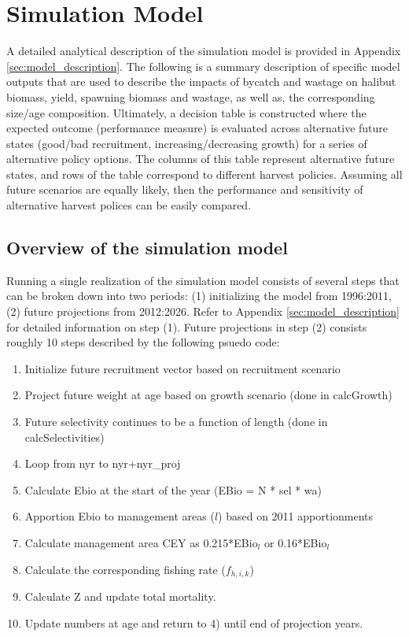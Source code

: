 
\section{Simulation Model} %
\label{sec:simulation_model}
A detailed analytical description of the simulation model is provided in Appendix \ref{sec:model_description}.  The following is a summary description of specific model outputs that are used to describe the impacts of bycatch and wastage on halibut biomass, yield, spawning biomass and wastage, as well as, the corresponding size/age composition.  Ultimately, a decision table is constructed where the expected outcome (performance measure) is evaluated across alternative future states (good/bad recruitment, increasing/decreasing growth) for a series of alternative policy options.  The columns of this table represent alternative future states, and rows of the table correspond to different harvest policies. Assuming all future scenarios are equally likely, then the performance and sensitivity of alternative harvest polices can be easily compared.

\subsection{Overview of the simulation model} %
\label{sub:overview_of_the_simulation_model}
 Running a single realization of the simulation model consists of several steps that can be broken down into two periods: (1) initializing the model from 1996:2011, (2) future projections from 2012:2026.  Refer to Appendix \ref{sec:model_description} for detailed information on step (1).  Future projections in step (2) consists roughly 10 steps described by the following psuedo code:
\begin{enumerate}
	\item	Initialize future recruitment vector based on recruitment scenario
	\item	Project future weight at age based on growth scenario  (done in calcGrowth)
	\item	Future selectivity continues to be a function of length (done in calcSelectivities)
	\item	Loop from nyr to nyr+nyr\_proj
	\item	Calculate Ebio at the start of the year (EBio = N * sel * wa)
	\item	Apportion Ebio to management areas ($l$) based on 2011 apportionments
	\item	Calculate management area CEY as 0.215*EBio$_l$ or 0.16*EBio$_l$
	\item	Calculate the corresponding fishing rate ($f_{h,i,k}$)
	\item	Calculate Z and update total mortality.
	\item	Update numbers at age and return to 4) until end of projection years.
\end{enumerate}


